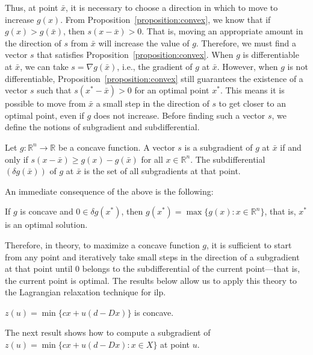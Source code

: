 Thus, at point $\bar{x}$, it is necessary to choose a direction in which to move
to increase $g(x)$. From Proposition~\ref{proposition:convex}, we know that if
$g(x) > g(\bar{x})$, then $s(x - \bar{x}) > 0$. That is, moving an appropriate
amount in the direction of $s$ from $\bar{x}$ will increase the value of $g$.
Therefore, we must find a vector $s$ that satisfies
Proposition~\ref{proposition:convex}. When $g$ is differentiable at $\bar{x}$,
we can take $s = \nabla g(\bar{x})$, i.e., the gradient of $g$ at $\bar{x}$.
However, when $g$ is not differentiable, Proposition~\ref{proposition:convex}
still guarantees the existence of a vector $s$ such that $s(x^* - \bar{x}) > 0$
for an optimal point $x^*$. This means it is possible to move from $\bar{x}$ a
small step in the direction of $s$ to get closer to an optimal point, even if
$g$ does not increase. Before finding such a vector $s$, we define the notions
of subgradient and subdifferential.

\begin{definition}\label{definition:subgradient}
	Let $g : \mathbb{R}^n \rightarrow \mathbb{R}$ be a concave function. A vector $s$ is a subgradient of $g$ at $\bar{x}$ if and only if $s(x - \bar{x}) \geq g(x) - g(\bar{x})$ for all $x \in \mathbb{R}^n$. The subdifferential $(\delta g(\bar{x}))$ of $g$ at $\bar{x}$ is the set of all subgradients at that point.
\end{definition}

An immediate consequence of the above is the following:

\begin{proposition}\label{proposition:optimal}
	If $g$ is concave and $0 \in \delta g(x^*)$, then $g(x^*) = \max\{g(x) : x \in \mathbb{R}^n\}$, that is, $x^*$ is an optimal solution.
\end{proposition}

Therefore, in theory, to maximize a concave function $g$, it is sufficient to
start from any point and iteratively take small steps in the direction of a
subgradient at that point until $0$ belongs to the subdifferential of the
current point—that is, the current point is optimal. The results below allow us
to apply this theory to the Lagrangian relaxation technique for \gls{ilp}.

\begin{proposition} \label{proposition-zu-convex}
	$z(u) = \min \{cx + u (d - Dx)\}$ is concave.
\end{proposition}

The next result shows how to compute a subgradient of $z(u) = \min \{cx + u (d -
	Dx) : x \in X\}$ at point $u$.


